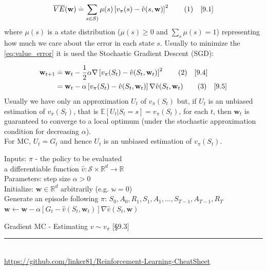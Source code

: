\documentclass[10pt,landscape]{article}
\newcommand\numberthis{\addtocounter{equation}{1}\tag{\theequation}}
\begin{document}
\begin{multicols}{3}
\begin{equation}
    \overline{VE}(\mathbf{w})  \stackrel{.}{=} \sum_{s \in \mathcal{S})} \mu(s) \left [ v_{\pi}(s) - \hat{v}(s, \mathbf{w}) \right ]^2 \label{eq:value_error} \numberthis \quad [9.1]  
\end{equation}
where $\mu(s)$ is a state distribution ($\mu(s) \ge 0$ and $\sum_s \mu(s) = 1$) representing how much we care about the error in each state $s$.
Usually to minimize the \ref{eq:value_error} it is used the Stochastic Gradient Descent (SGD):

\begin{align*}
    \mathbf{w}_{t+1} & \stackrel{.}{=} \mathbf{w}_{t} - \frac{1}{2} \alpha \nabla \left [ v_{\pi}(S_t) - \hat{v}(S_t, \mathbf{w}_t) \right ]^2 \numberthis \quad [9.4]\\
& = \mathbf{w}_{t} - \alpha \left [ v_{\pi}(S_t) - \hat{v}(S_t, \mathbf{w}_t) \right ] \nabla \hat{v}(S_t, \mathbf{w}_t) \numberthis \quad [9.5]
\end{align*}
Usually we have only an approximation $U_t$ of $v_{\pi}(S_t)$ but, if $U_t$ is an unbiased estimation of $v_{\pi}(S_t)$, that is $\mathbb{E}[U_t|S_t=s] = v_{\pi}(S_t)$, for each $t$, then $\mathbf{w}_t$ is guaranteed to converge to a local optimum (under the stochastic approximation condition for decreasing $\alpha$). \\
For MC, $U_t \stackrel{.}{=} G_t$ and hence $U_t$ is an unbiased estimation of $v_{\pi}(S_t)$.

\begin{algorithm}[H]
Inputs: $\pi$ - the policy to be evaluated \\
		a differentiable function $\hat{v} : \mathcal{S} \times \mathbb{R}^d \rightarrow \mathbb{R}$ \\
Parameters: step size $\alpha > 0$ \\
Initialize: $\mathbf{w} \in \mathbb{R}^d$ arbitrarily (e.g. $\mathbb{w} = 0$) \\
{
    Generate an episode following $\pi$: $S_0, A_0, R_1, S_1, A_1,..., S_{T-1}, A_{T-1}, R_T$\\
    {
		$\mathbf{w} \leftarrow \mathbf{w} - \alpha \left [ G_t - \hat{v}(S_t, \mathbf{w}_t) \right ] \nabla \hat{v}(S_t, \mathbf{w})$
    }
 }
\caption{Gradient MC - Estimating $v \sim v_{\pi}$ [§9.3]}
\end{algorithm}

\rule{0.3\linewidth}{0.25pt} \\
\scriptsize
\href{https://github.com/linker81/Reinforcement-Learning-CheatSheet}{https://github.com/linker81/Reinforcement-Learning-CheatSheet}
\end{multicols}
\end{document}
